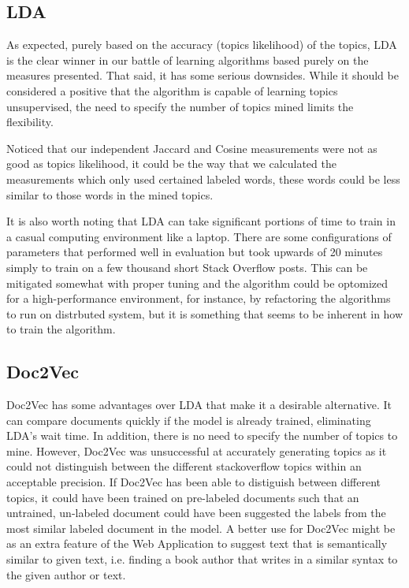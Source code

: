\subsection{LDA}
\label{sec:conc:lda}
As expected, purely based on the accuracy (topics likelihood) of the 
topics, LDA is the clear winner in our battle of learning algorithms 
based purely on the measures presented. 
That said, it has some serious downsides.
While it should be considered a positive that the algorithm is capable
of learning topics unsupervised, the need to specify the number of
topics mined limits the flexibility.

Noticed that our independent Jaccard and Cosine measurements were not 
as good as topics likelihood, it could be the way that we calculated 
the measurements which only used certained labeled words, these words 
could be less similar to those words in the mined topics.

It is also worth noting that LDA can take significant portions of time
to train in a casual computing environment like a laptop.
There are some configurations of parameters that performed well in
evaluation but took upwards of 20 minutes simply to train on a few
thousand short Stack Overflow posts.
This can be mitigated somewhat with proper tuning and the algorithm
could be optomized for a high-performance environment, for instance, 
by refactoring the algorithms to run on distrbuted system, but it is
something that seems to be inherent in how to train the algorithm.

% 
\subsection{Doc2Vec}
\label{sec:conc:doc2vec}
Doc2Vec has some advantages over LDA that make it a desirable alternative. It can compare documents quickly if the model is already trained, eliminating LDA's wait time. In addition, there is no need to specify the number of topics to mine. However, Doc2Vec was unsuccessful at accurately generating topics as it could not distinguish between the different stackoverflow topics within an acceptable precision. If Doc2Vec has been able to distiguish between different topics, it could have been trained on pre-labeled documents such that an untrained, un-labeled document could have been suggested the labels from the most similar labeled document in the model. A better use for Doc2Vec might be as an extra feature of the Web Application to suggest text that is semantically similar to given text, i.e. finding a book author that writes in a similar syntax to the given author or text. 




